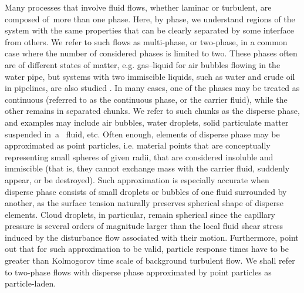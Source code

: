 \documentclass{pracamgren}
\begin{document}
Many processes that involve fluid flows, whether laminar or turbulent, are composed of~more than one phase.
Here, by phase, we understand regions of the system with the same properties that can be clearly separated by some interface from others.
We refer to such flows as multi-phase, or two-phase, in a common case where the number of considered phases is limited to two.
These phases often are of different states of matter, e.g. gas--liquid for air bubbles flowing in the water pipe, but systems with two immiscible liquids, such as water and crude oil in pipelines, are also studied \parencite{Brauner2003}.
In many cases, one of the phases may be treated as continuous (referred to as the continuous phase, or the carrier fluid), while the other remains in separated chunks.
We refer to such chunks as the disperse phase, and examples may include air bubbles, water droplets, solid particulate matter suspended in~a~ fluid, etc.
Often enough, elements of disperse phase may be approximated as point particles, i.e. material points that are conceptually representing small spheres of given radii, that are considered insoluble and immiscible (that is, they cannot exchange mass with the carrier fluid, suddenly appear, or be destroyed).
Such approximation is especially accurate when disperse phase consists of small droplets or bubbles of one fluid surrounded by another, as the surface tension naturally preserves spherical shape of disperse elements.
Cloud droplets, in particular, remain spherical since the capillary pressure is several orders of magnitude larger than the local fluid shear stress induced by the disturbance flow associated with their motion.
Furthermore, \textcite[Figure 1, therein]{Balachandar2010} point out that for such approximation to be valid, particle response times have to be greater than Kolmogorov time scale of background turbulent flow. 
We shall refer to two-phase flows with disperse phase approximated by point particles as particle-laden.
\end{document}
